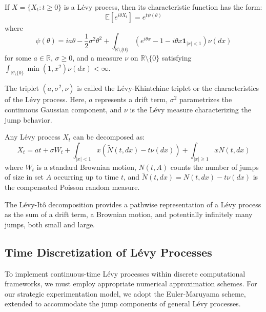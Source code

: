 \begin{theorem}
\label{thm:levy_khintchine}
If $X = \{X_t : t \geq 0\}$ is a Lévy process, then its characteristic function has the form:
\begin{equation}
    \mathbb{E}[e^{i\theta X_t}] = e^{t\psi(\theta)}
\end{equation}
where 
\begin{equation}
    \psi(\theta) = ia\theta - \frac{1}{2}\sigma^2\theta^2 + \int_{\mathbb{R}\setminus\{0\}} (e^{i\theta x} - 1 - i\theta x\mathbf{1}_{|x|<1})\nu(dx)
\end{equation}
for some $a \in \mathbb{R}$, $\sigma \geq 0$, and a measure $\nu$ on $\mathbb{R}\setminus\{0\}$ satisfying $\int_{\mathbb{R}\setminus\{0\}} \min(1, x^2)\nu(dx) < \infty$.
\citep{sato1999levy}
\end{theorem}

The triplet $(a, \sigma^2, \nu)$ is called the Lévy-Khintchine triplet or the characteristics of the Lévy process. Here, $a$ represents a drift term, $\sigma^2$ parametrizes the continuous Gaussian component, and $\nu$ is the Lévy measure characterizing the jump behavior.

\begin{theorem}
\label{thm:levy_ito}
Any Lévy process $X_t$ can be decomposed as:
\begin{equation}
    X_t = at + \sigma W_t + \int_{|x|<1} x (\tilde{N}(t, dx) - t\nu(dx)) + \int_{|x|\geq 1} x N(t, dx)
\end{equation}
where $W_t$ is a standard Brownian motion, $N(t, A)$ counts the number of jumps of size in set $A$ occurring up to time $t$, and $\tilde{N}(t, dx) = N(t, dx) - t\nu(dx)$ is the compensated Poisson random measure.
\citep{applebaum2009levy}
\end{theorem}

The Lévy-Itô decomposition provides a pathwise representation of a Lévy process as the sum of a drift term, a Brownian motion, and potentially infinitely many jumps, both small and large.

\subsection{Time Discretization of Lévy Processes}
\label{appendix:levy_discretization_methods}

To implement continuous-time Lévy processes within discrete computational frameworks, we must employ appropriate numerical approximation schemes. For our strategic experimentation model, we adopt the Euler-Maruyama scheme, extended to accommodate the jump components of general Lévy processes.

